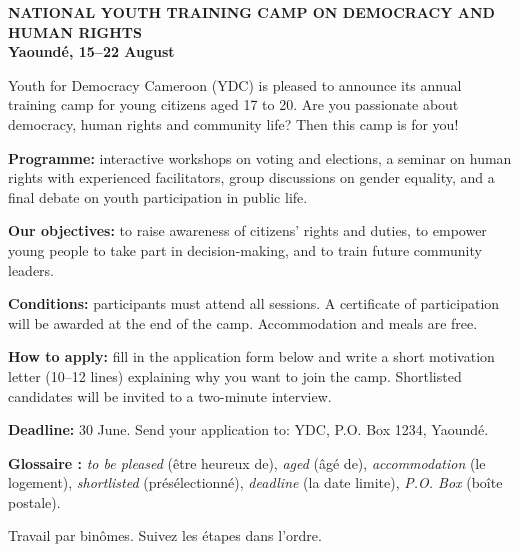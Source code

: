 \documentclass[11pt]{article}
\newcounter{popsec}
\newcounter{popsub}
\newcommand{\courssub}[1]{%
  \stepcounter{popsub}%
  \par\vspace{9pt}\noindent{\popxbold\fontsize{11.5}{13}\selectfont\color{popink}{\color{poporange}\thepopsec.\thepopsub}\hspace{6pt}#1}\par\nopagebreak\vspace{4pt}
}
\begin{document}
\begin{textebox}
\textbf{NATIONAL YOUTH TRAINING CAMP ON DEMOCRACY AND HUMAN RIGHTS}\\
\textbf{Yaoundé, 15--22 August}

Youth for Democracy Cameroon (YDC) is pleased to announce its annual training camp for young citizens aged 17 to 20. Are you passionate about democracy, human rights and community life? Then this camp is for you!

\textbf{Programme:} interactive workshops on voting and elections, a seminar on human rights with experienced facilitators, group discussions on gender equality, and a final debate on youth participation in public life.

\textbf{Our objectives:} to raise awareness of citizens' rights and duties, to empower young people to take part in decision-making, and to train future community leaders.

\textbf{Conditions:} participants must attend all sessions. A certificate of participation will be awarded at the end of the camp. Accommodation and meals are free.

\textbf{How to apply:} fill in the application form below and write a short motivation letter (10--12 lines) explaining why you want to join the camp. Shortlisted candidates will be invited to a two-minute interview.

\textbf{Deadline:} 30 June. Send your application to: YDC, P.O. Box 1234, Yaoundé.
\end{textebox}

\textbf{Glossaire :} \emph{to be pleased} (être heureux de), \emph{aged} (âgé de), \emph{accommodation} (le logement), \emph{shortlisted} (présélectionné), \emph{deadline} (la date limite), \emph{P.O. Box} (boîte postale).

\courssub{Consignes}

Travail par binômes. Suivez les étapes dans l'ordre.
\end{document}
